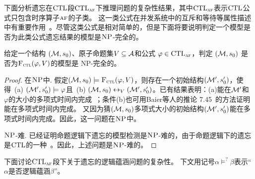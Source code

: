 下面分析遗忘在$\textrm{CTL}$段$\textrm{CTL}_{\textsc{a}\textsc{f}}$下推理问题的复杂性结果，其中$\textrm{CTL}_{\textsc{a}\textsc{f}}$表示$\textrm{CTL}$公式只包含时序算子$\textsc{a} \textsc{f}$的子类。
这一类公式在并发系统中的互斥和等待等属性描述中有重要作用~\cite{Baier:PMC:2008}。尽管这类公式是相对简单的，但是下面将要说明判定一个模型是否为此类公式遗忘结果的模型是$\textsc{NP}$-完全的。
\begin{proposition}[模型检测]
	\label{modelChecking}
	给定一个结构 $({\cal M},s_0)$、原子命题集$V\subseteq{\cal A}$和公式 $\varphi \in \textrm{CTL}_{\textsc{a}\textsc{f}}$，判定 $({\cal M},s_0)$ 是否为${\textsc{F}_{\textsc{ctl}}}(\varphi, V)$的模型是 \textsc{NP}-完全的。
\end{proposition}
\begin{proof}
	在$\textsc{NP}$中. 假定$({\cal M},s_0) \models {\textsc{F}_{\textsc{ctl}}}(\varphi,V)$，则存在一个初始结构$({\cal M}', s_0')$，使得\ (a) $({\cal M}',s_0') \models \varphi$且\ (b) $({\cal M},s_0) \leftrightarrow_V ({\cal M}',s_0')$。已有结果表明：(a)能在${\cal M}'$和 $\varphi$的大小的多项式时间内完成~\cite{DBLP:books/daglib/0007403}；条件(b)也可用Baier等人的推论 7.45~\cite{Baier:PMC:2008}的方法证明能在多项式时间内完成。
	又因为猜$({\cal M},s_0)$多项式大小的初始结构$({\cal M}',s_0')$能在多项式时间内完成。因此，这一问题在$\textsc{NP}$中。
	
	$\textsc{NP}$-难. 已经证明命题逻辑下遗忘的模型检测是$\textsc{NP}$-难的，由于命题逻辑下的遗忘是$\textrm{CTL}$的一种~\cite{Zhang2008Properties}。因此，上述问题是$\textsc{NP}$-难的。
\end{proof}

下面讨论$\textrm{CTL}_{\textsc{a}\textsc{f}}$段下关于遗忘的逻辑蕴涵问题的复杂性。
下文用记号$\alpha \models^? \beta$表示“$\alpha$是否逻辑蕴涵$\beta$”。

